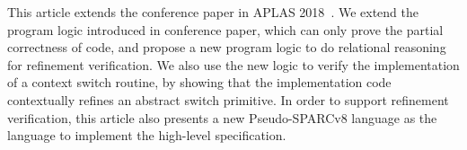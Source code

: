 This article extends the conference paper in 
APLAS 2018~\cite{zha18aplas}. 
We extend the program logic introduced in conference 
paper, which can only prove the partial 
correctness of \sparc{} code, and propose a new 
program logic to do relational reasoning for 
refinement verification. We also use the new logic 
to verify the implementation of a context switch routine, 
by showing that the implementation code contextually 
refines an abstract switch primitive. 
In order to support refinement verification, 
this article also presents a new Pseudo-SPARCv8 language 
as the language to implement the high-level specification.





